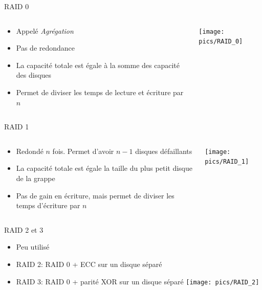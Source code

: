 \begin{frame}[fragile=singleslide]{RAID 0}
  \begin{columns}
    \begin{column}{6cm}
      \begin{itemize}
      \item Appelé \emph{Agrégation}
      \item Pas de redondance
      \item La capacité  totale est égale à la  somme des capacité des
        disques
      \item Permet de diviser les temps de lecture et écriture par $n$
      \end{itemize}
    \end{column}
    \begin{column}{4cm}
      \texttt{[image: pics/RAID\_0]}
    \end{column}
  \end{columns}
\end{frame}

\begin{frame}[fragile=singleslide]{RAID 1}
  \begin{columns}
    \begin{column}{6cm}
      \begin{itemize}
      \item Redondé $n$ fois. Permet d'avoir $n-1$ disques défaillants
      \item  La capacité  totale est  égale  la taille  du plus  petit
        disque de la grappe
      \item Pas de gain en  écriture, mais permet de diviser les temps
        d'écriture par $n$
      \end{itemize}
    \end{column}
    \begin{column}{4cm}
      \texttt{[image: pics/RAID\_1]}
    \end{column}
  \end{columns}
\end{frame}

\begin{frame}[fragile=singleslide]{RAID 2 et 3}
  \begin{itemize}
  \item Peu utilisé
  \item RAID 2: RAID 0 + ECC sur un disque séparé
  \item RAID 3: RAID 0 +  parité XOR  sur un disque séparé
    \texttt{[image: pics/RAID\_2]}
  \end{itemize}
\end{frame}

